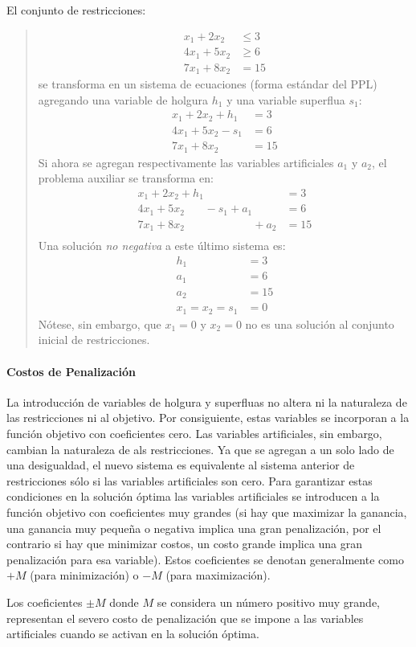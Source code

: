 \ejemplo\label{ej:fase_1} El conjunto de restricciones:
\begin{quote}
  \begin{align*}
    x_1 + 2x_2 &\leq 3 \\
    4x_1 + 5x_2 &\geq 6 \\
    7x_1 + 8x_2 &= 15
  \end{align*}
  se transforma en un sistema de ecuaciones (forma estándar del PPL) agregando una variable de holgura \(h_1\) y una variable superflua \(s_1\):
  \begin{align*}
    x_1 + 2x_2 + h_1 &= 3 \\
    4x_1 + 5x_2 - s_1 &= 6 \\
    7x_1 + 8x_2 &= 15
  \end{align*}
  Si ahora se agregan respectivamente las variables artificiales \(a_1\) y \(a_2\), el problema auxiliar se transforma en:
  \begin{align*}
    x_1 + 2x_2 + h_1 \phantom{+ s_1 + a_1 + a_2} &= 3 \\
    4x_1 + 5x_2 \phantom{+ h_1} - s_1 + a_1 \phantom{+ a_2} &= 6 \\
    7x_1 + 8x_2 \phantom{+ h_1 - s_1 + a_1} + a_2 &= 15 \\
  \end{align*}
  Una solución \textit{no negativa} a este último sistema es:
  \begin{align*}
    h_1 &= 3 \\
    a_1 &= 6 \\
    a_2 &= 15 \\
    x_1 = x_2 = s_1 &= 0
  \end{align*}
  Nótese, sin embargo, que \(x_1=0\) y \(x_2=0\) no es una solución al conjunto inicial de restricciones. 
\end{quote}

\paragraph{Costos de Penalización}

La introducción de variables de holgura y superfluas no altera ni la naturaleza de las restricciones ni al objetivo. Por consiguiente, estas variables se incorporan a la función objetivo con coeficientes cero. Las variables artificiales, sin embargo, cambian la naturaleza de als restricciones. Ya que se agregan a un solo lado de una desigualdad, el nuevo sistema es equivalente al sistema anterior de restricciones sólo si las variables artificiales son cero. Para garantizar estas condiciones en la solución óptima las variables artificiales se introducen a la función objetivo con coeficientes muy grandes (si hay que maximizar la ganancia, una ganancia muy pequeña o negativa implica una gran penalización, por el contrario si hay que minimizar costos, un costo grande implica una gran penalización para esa variable). Estos coeficientes se denotan generalmente como \(+M\) (para minimización) o \(-M\) (para maximización).

Los coeficientes \(\pm M\) donde \(M\) se considera un número positivo muy grande, representan el severo costo de penalización que se impone a las variables artificiales cuando se activan en la solución óptima. 